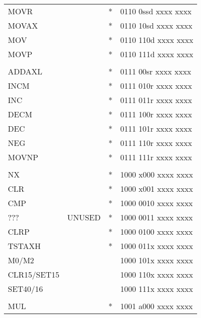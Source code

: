 \documentclass[oneside,english,a4paper,10pt,oneside,openany,final]{memoir}
\begin{document}
\begin{center}
\begin{longtable}{TllT}
MOVR        &          & *  & 0110 0ssd xxxx xxxx                     \\
MOVAX       &          & *  & 0110 10sd xxxx xxxx                     \\
MOV         &          & *  & 0110 110d xxxx xxxx                     \\
MOVP        &          & *  & 0110 111d xxxx xxxx                     \\
            &          &    &                                         \\
ADDAXL      &          & *  & 0111 00sr xxxx xxxx                     \\
INCM        &          & *  & 0111 010r xxxx xxxx                     \\
INC         &          & *  & 0111 011r xxxx xxxx                     \\
DECM        &          & *  & 0111 100r xxxx xxxx                     \\
DEC         &          & *  & 0111 101r xxxx xxxx                     \\
NEG         &          & *  & 0111 110r xxxx xxxx                     \\
MOVNP       &          & *  & 0111 111r xxxx xxxx                     \\
            &          &    &                                         \\
NX          &          & *  & 1000 x000 xxxx xxxx                     \\
CLR         &          & *  & 1000 x001 xxxx xxxx                     \\
CMP         &          & *  & 1000 0010 xxxx xxxx                     \\
???         & UNUSED   & *  & 1000 0011 xxxx xxxx                     \\
CLRP        &          & *  & 1000 0100 xxxx xxxx                     \\
TSTAXH      &          & *  & 1000 011x xxxx xxxx                     \\
M0/M2       &          &    & 1000 101x xxxx xxxx                     \\
CLR15/SET15 &          &    & 1000 110x xxxx xxxx                     \\
SET40/16    &          &    & 1000 111x xxxx xxxx                     \\
            &          &    &                                         \\
MUL         &          & *  & 1001 a000 xxxx xxxx                     \\

\end{longtable}
\end{center}
\end{document}
